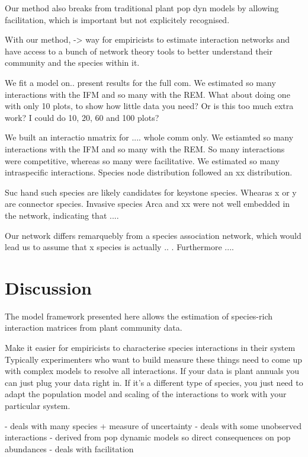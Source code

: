 \documentclass[a4,12pt]{article}
\begin{document}
    Our method also breaks from traditional plant pop dyn models by allowing facilitation, which is important but not explicitely recognised.

    With our method, -> way for empiricists to estimate interaction networks and have access to a bunch of network theory tools to better understand their community and the species within it. 






    We fit a model on.. present results for the full com. We estimated so many interactions with the IFM and so many with the REM. What about doing one with only 10 plots, to show how little data you need? Or is this too much extra work? I could do 10, 20, 60 and 100 plots?

    We built an interactio nmatrix for .... whole comm only. We estiamted so many interactions with the IFM and so many with the REM. So many interactions were competitive, whereas so many were facilitative. We estimated so many intraspecific interactions. Species node distribution followed an xx distribution. 

    Suc hand such species are likely candidates for keystone species. Whearas x or y are connector species. Invasive species Arca and xx were not well embedded in the network, indicating that .... 

    Our network differs remarquebly from a species association network, which would lead us to assume that x species is actually .. . Furthermore .... 


    \section{Discussion}

    
    The model framework presented here allows the estimation of species-rich interaction matrices from plant community data. 

    Make it easier for empiricists to characterise species interactions in their system
    Typically experimenters who want to build measure these things need to come up with complex models to resolve all interactions. If your data is plant annuals you can just plug your data right in. If it's a different type of species, you just need to adapt the population model and scaling of the interactions to work with your particular system. 

    - deals with many species + measure of uncertainty
    - deals with some unobserved interactions
    - derived from pop dynamic models so direct consequences on pop abundances
    - deals with facilitation 
\end{document}
